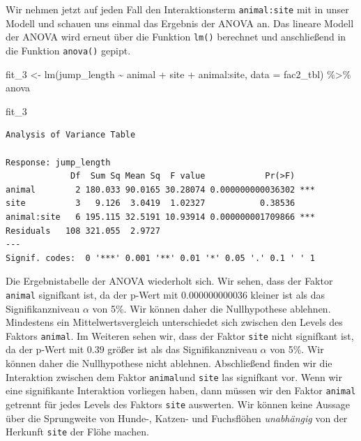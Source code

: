 \documentclass[
  letterpaper,
]{scrbook}
\newenvironment{Shaded}{\begin{snugshade}}{\end{snugshade}}
\newcommand{\AttributeTok}[1]{\textcolor[rgb]{0.40,0.45,0.13}{#1}}
\newcommand{\FunctionTok}[1]{\textcolor[rgb]{0.28,0.35,0.67}{#1}}
\newcommand{\NormalTok}[1]{\textcolor[rgb]{0.00,0.23,0.31}{#1}}
\newcommand{\OtherTok}[1]{\textcolor[rgb]{0.00,0.23,0.31}{#1}}
\newcommand{\SpecialCharTok}[1]{\textcolor[rgb]{0.37,0.37,0.37}{#1}}
\begin{document}
Wir nehmen jetzt auf jeden Fall den Interaktionsterm
\texttt{animal:site} mit in unser Modell und schauen uns einmal das
Ergebnis der ANOVA an. Das lineare Modell der ANOVA wird erneut über die
Funktion \texttt{lm()} berechnet und anschließend in die Funktion
\texttt{anova()} gepipt.

\begin{Shaded}
\begin{Highlighting}[]
\NormalTok{fit\_3 }\OtherTok{\textless{}{-}}  \FunctionTok{lm}\NormalTok{(jump\_length }\SpecialCharTok{\textasciitilde{}}\NormalTok{ animal }\SpecialCharTok{+}\NormalTok{ site }\SpecialCharTok{+}\NormalTok{ animal}\SpecialCharTok{:}\NormalTok{site, }\AttributeTok{data =}\NormalTok{ fac2\_tbl) }\SpecialCharTok{\%\textgreater{}\%} 
\NormalTok{  anova}

\NormalTok{fit\_3}
\end{Highlighting}
\end{Shaded}

\begin{verbatim}
Analysis of Variance Table

Response: jump_length
             Df  Sum Sq Mean Sq  F value            Pr(>F)    
animal        2 180.033 90.0165 30.28074 0.000000000036302 ***
site          3   9.126  3.0419  1.02327           0.38536    
animal:site   6 195.115 32.5191 10.93914 0.000000001709866 ***
Residuals   108 321.055  2.9727                               
---
Signif. codes:  0 '***' 0.001 '**' 0.01 '*' 0.05 '.' 0.1 ' ' 1
\end{verbatim}

{}

Die Ergebnistabelle der ANOVA wiederholt sich. Wir sehen, dass der
Faktor \texttt{animal} signifkant ist, da der p-Wert mit
\(0.000000000036\) kleiner ist als das Signifikanzniveau \(\alpha\) von
5\%. Wir können daher die Nullhypothese ablehnen. Mindestens ein
Mittelwertsvergleich unterschiedet sich zwischen den Levels des Faktors
\texttt{animal}. Im Weiteren sehen wir, dass der Faktor \texttt{site}
nicht signifkant ist, da der p-Wert mit \(0.39\) größer ist als das
Signifikanzniveau \(\alpha\) von 5\%. Wir können daher die Nullhypothese
nicht ablehnen. Abschließend finden wir die Interaktion zwischen dem
Faktor \texttt{animal}und \texttt{site} las signifkant vor. Wenn wir
eine signifikante Interaktion vorliegen haben, dann müssen wir den
Faktor \texttt{animal} getrennt für jedes Levels des Faktors
\texttt{site} auswerten. Wir können keine Aussage über die Sprungweite
von Hunde-, Katzen- und Fuchsflöhen \emph{unabhängig} von der Herkunft
\texttt{site} der Flöhe machen.
\end{document}
